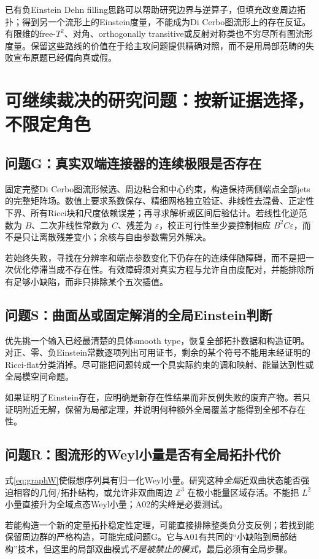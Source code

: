 \documentclass[UTF8,a4paper,11pt,fontset=fandol]{ctexart}
\numberwithin{equation}{section}
\theoremstyle{definition}
\newcommand{\Z}{\mathbb Z}
\begin{document}
已有负Einstein Dehn filling思路可以帮助研究边界与逆算子，但填充改变周边拓扑；得到另一个流形上的Einstein度量，不能成为Di Cerbo图流形上的存在反证。有限维的free-$T^2$、对角、orthogonally transitive或反射对称类也不穷尽所有图流形度量。保留这些路线的价值在于给主攻问题提供精确对照，而不是用局部范畴的失败宣布原题已经偏向真或假。

\section{可继续裁决的研究问题：按新证据选择，不限定角色}
\subsection{问题G：真实双端连接器的连续极限是否存在}
固定完整Di Cerbo图流形候选、周边粘合和中心约束，构造保持两侧端点全部jets的完整矩阵场。数值上要求系数保存、精细网格独立验证、非线性去混叠、正定性下界、所有Ricci块和尺度依赖误差；再寻求解析或区间后验估计。若线性化逆范数为 $B$、二次非线性常数为 $C$、残差为 $\varepsilon$，校正可行性至少要控制相应 $B^2C\varepsilon$，而不是只让离散残差变小；余核与自由参数需另外解决。

若始终失败，寻找在分辨率和端点参数变化下仍存在的连续伴随障碍，而不是把一次优化停滞当成不存在性。有效障碍须对真实方程与允许自由度配对，并能排除所有足够小缺陷，而非只排除某个五次插值。

\subsection{问题S：曲面丛或固定解消的全局Einstein判断}
优先挑一个输入已经最清楚的具体smooth type，恢复全部拓扑数据和构造证明。对正、零、负Einstein常数逐项列出可用证书，剩余的某个符号不能用未经证明的Ricci-flat分类消掉。尽可能把问题转成一个具实际约束的调和映射、能量达到性或全局模空间命题。

如果证明了Einstein存在，应明确是新存在性结果而非反例失败的废弃产物。若只证明附近无解，保留为局部定理，并说明何种额外全局覆盖才能得到全部不存在性。

\subsection{问题R：图流形的Weyl小量是否有全局拓扑代价}
式\eqref{eq:graphW}使假想序列具有归一化Weyl小量。研究这种\emph{全局}近双曲状态能否强迫相容的几何/拓扑结构，或允许非双曲周边 $\Z^3$ 在极小能量区域存活。不能把 $L^2$ 小量直接升为全域点态Weyl小量；A02的尖峰是必要测试。

若能构造一个新的定量拓扑稳定性定理，可能直接排除整类负分支反例；若找到能保留周边群的严格构造，可能完成问题G。它与A01有共同的“小缺陷到局部结构”技术，但这里的局部双曲模式\emph{不是被禁止的模式}，最后必须有全局步骤。
\end{document}
